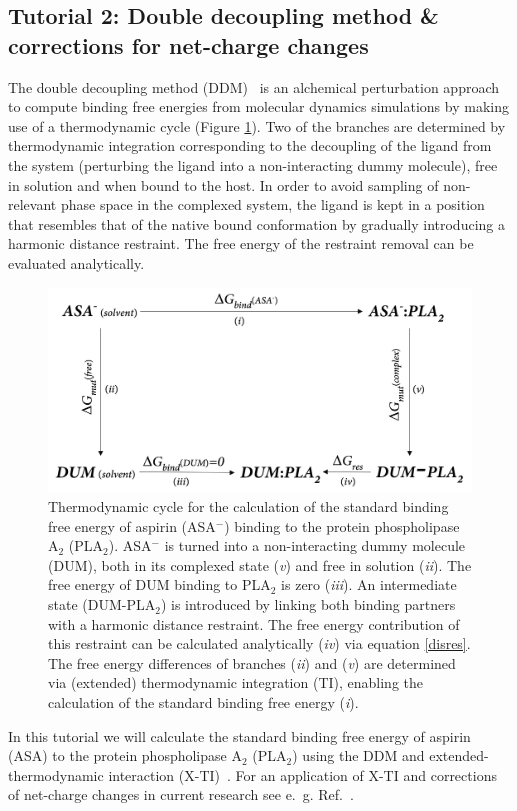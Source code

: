 
\subsection{Tutorial 2: Double decoupling method \& corrections for net-charge changes}
The double decoupling method (DDM)~\cite{DDM} is an alchemical perturbation approach to compute binding free energies from molecular dynamics simulations by making use of a thermodynamic cycle (Figure \ref{TC_ASA}). Two of the branches are determined by thermodynamic integration corresponding to the decoupling of the ligand from the system (perturbing the ligand into a non-interacting dummy molecule), free in solution and when bound to the host. In order to avoid sampling of non-relevant phase space in the complexed system, the ligand is kept in a position that resembles that of the native bound conformation by gradually introducing a harmonic distance restraint. The free energy of the restraint removal can be evaluated analytically.

\begin{figure}[H]
    \centering
    \includegraphics[scale=0.21]{../05_tutorial_02/figures/TC_ASA.png}
    \caption{Thermodynamic cycle for the calculation of the standard binding free energy of aspirin (ASA$^-$) binding to the protein phospholipase A$_2$ (PLA$_2$). ASA$^-$ is turned into a non-interacting dummy molecule (DUM), both in its complexed state (\textit{v}) and free in solution (\textit{ii}). The free energy of DUM binding to PLA$_2$ is zero (\textit{iii}). An intermediate state (DUM-PLA$_2$) is introduced by linking both binding partners with a harmonic distance restraint. The free energy contribution of this restraint can be calculated analytically (\textit{iv}) via equation \ref{disres}. The free energy differences of branches (\textit{ii}) and (\textit{v}) are determined via (extended) thermodynamic integration (TI), enabling the calculation of the standard binding free energy (\textit{i}).}
    \label{TC_ASA}
\end{figure}
%
In this tutorial we will calculate the standard binding free energy of aspirin (ASA) to the protein phospholipase A$_2$ (PLA$_2$) using the DDM and extended-thermodynamic interaction (X-TI)~\cite{X_TI}. 
For an application of X-TI and corrections of net-charge changes in current research see e.~g. Ref.~\cite{Ohlknecht_2020b}.

